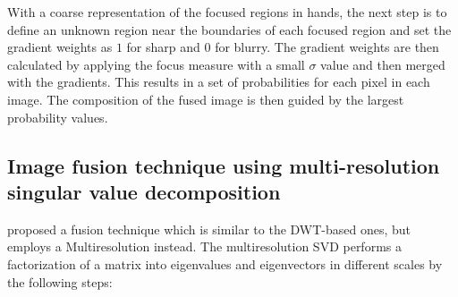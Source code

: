 With a coarse representation of the focused regions in hands, the next step is to define an unknown region near the boundaries of each focused region and set the gradient weights as $1$ for sharp and $0$ for blurry. The gradient weights are then calculated by applying the focus measure with a small $\sigma$ value and then merged with the gradients. This results in a set of probabilities for each pixel in each image. The composition of the fused image is then guided by the largest probability values.

\subsection{Image fusion technique using multi-resolution singular value decomposition}

 proposed a fusion technique which is similar to the DWT-based ones, but employs a Multiresolution  instead. The multiresolution SVD performs a factorization of a matrix into eigenvalues and eigenvectors in different scales by the following steps:

